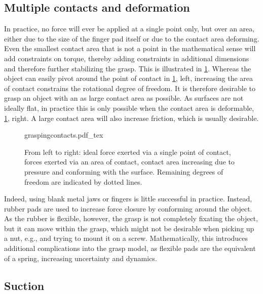 \subsection{Multiple contacts and deformation}
In practice, no force will ever be applied at a single point only, but over an area, either due to the size of the finger pad itself or due to the contact area deforming. Even the smallest contact area that is not a point in the mathematical sense will add constraints on torque, thereby adding constraints in additional dimensions and therefore further stabilizing the grasp. This is illustrated in \cref{fig:contactarea}. Whereas the object can easily pivot around the point of contact in \cref{fig:contactarea}, left, increasing the area of contact constrains the rotational degree of freedom. It is therefore desirable to grasp an object with an as large contact area as possible. As surfaces are not ideally flat, in practice this is only possible when the contact area is deformable, \cref{fig:contactarea}, right. A large contact area will also increase friction, which is usually desirable.

\begin{figure}
    \def\svgwidth{\textwidth}
    {graspingcontacts.pdf_tex}
    \caption{From left to right: ideal force exerted via a single point of contact, forces exerted via an area of contact, contact area increasing due to pressure and conforming with the surface. Remaining degrees of freedom are indicated by dotted lines.\label{fig:contactarea}}
\end{figure}

Indeed, using blank metal jaws or fingers is little successful in practice. Instead, rubber pads are used to increase force closure by conforming around the object. As the rubber is flexible, however, the grasp is not completely fixating the object, but it can move within the grasp, which might not be desirable when picking up a nut, e.g., and trying to mount it on a screw. Mathematically, this introduces additional complications into the grasp model, as flexible pads are the equivalent of a spring, increasing uncertainty and dynamics.

\subsection{Suction}

